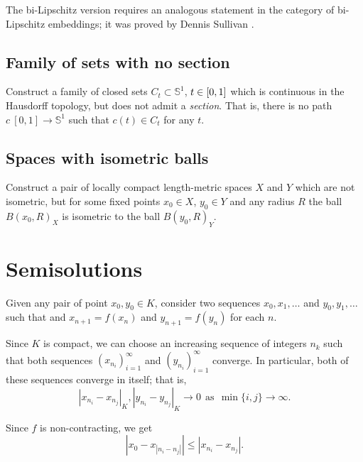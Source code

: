 The  bi-Lipschitz version requires 
an analogous statement in the category of bi-Lipschitz embeddings;
it was proved by
Dennis Sullivan \cite[see][]{sullivan}.

\subsection*{Family of sets with no section\easy}
\label{hausdorff-section} 

\begin{pr}
Construct a family of closed sets $C_t\subset\mathbb{S}^1$, $t\z\in [0,1]$
which is continuous in the Hausdorff topology, 
but does not admit a {}\emph{section}.
That is, there is no path $c\:[0,1]\to \mathbb{S}^1$ such that $c(t)\in C_t$ for any $t$.
\end{pr}

\subsection*{Spaces with isometric balls}

\begin{pr}
Construct a pair of locally compact length-metric spaces $X$ and $Y$ 
which are not isometric,
but for some fixed points $x_0\in X$,  $y_0\in Y$ and any radius $R$
the ball $B(x_0,R)_X$ is 
isometric to the ball $B(y_0,R)_Y$.
\end{pr}



\section*{Semisolutions}



Given any pair of point $x_0,y_0\in K$, 
consider two sequences $x_0,x_1,\dots$ and $y_0,y_1,\dots$
such that 
and $x_{n+1}=f(x_n)$ and $y_{n+1}=f(y_n)$ for each $n$.

Since $K$ is compact, 
we can choose an increasing sequence of integers $n_k$
such that both sequences $(x_{n_i})_{i=1}^\infty$ and $(y_{n_i})_{i=1}^\infty$
converge.
In particular, both of these sequences converge in itself;
that is,
\[
|x_{n_i}-x_{n_j}|_K, |y_{n_i}-y_{n_j}|_K\to 0
\ \ 
\text{as}
\ \ \min\{i,j\}\to\infty.
\]


Since $f$ is non-contracting, we get
\[
|x_0-x_{|n_i-n_j|}|
\le 
|x_{n_i}-x_{n_j}|.
\]

